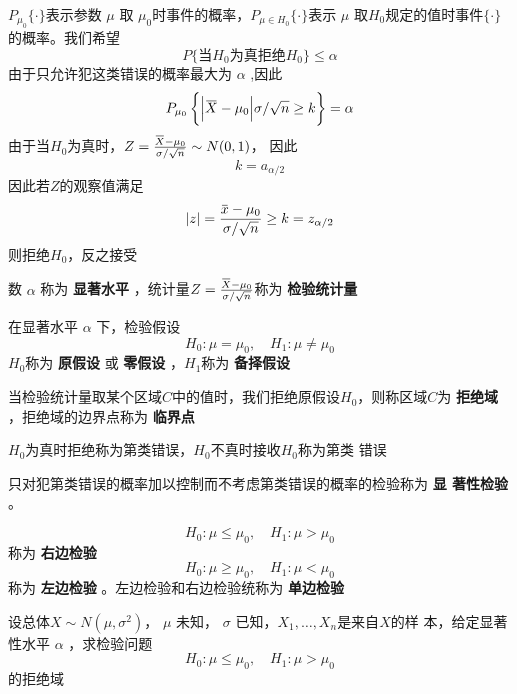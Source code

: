 \documentclass[11pt]{article}
\begin{document}
\(P_{\mu_0}\{\cdot\}\)表示参数 \(\mu\)  取 \(\mu_0\)时事件的概率，\(P_{\mu\in
   H_0}\{\cdot\}\)表示 \(\mu\) 取\(H_0\)规定的值时事件\(\{\cdot\}\)的概率。我们希望
\begin{equation*}
P\{\text{当$H_0$为真拒绝$H_0$}\}\le\alpha
\end{equation*}
由于只允许犯这类错误的概率最大为 \(\alpha\) ,因此
\begin{equation*}
P_{\mu_0}\left\{
\abs{\bbar{X}-\mu_0}{\sigma/\sqrt{n}}\ge k
\right\}=\alpha
\end{equation*}
由于当\(H_0\)为真时，\(Z=\frac{\bbar{X}-\mu_0}{\sigma/\sqrt{n}}\sim N(0,1)\)，
因此
\begin{equation*}
k=a_{\alpha/2}
\end{equation*}
因此若\(Z\)的观察值满足
\begin{equation*}
\abs{z}=\frac{\bbar{x}-\mu_0}{\sigma/\sqrt{n}}\ge k=z_{\alpha/2}
\end{equation*}
则拒绝\(H_0\)，反之接受

数 \(\alpha\) 称为 \textbf{显著水平} ，统计量\(Z=\frac{\bbar{X}-\mu_0}{\sigma/\sqrt{n}}\)称为
\textbf{检验统计量}

在显著水平 \(\alpha\) 下，检验假设
\begin{equation*}
H_0:\mu=\mu_0,\quad H_1:\mu\neq\mu_0
\end{equation*}
\(H_0\)称为 \textbf{原假设} 或 \textbf{零假设} ，\(H_1\)称为 \textbf{备择假设}

当检验统计量取某个区域\(C\)中的值时，我们拒绝原假设\(H_0\)，则称区域\(C\)为
\textbf{拒绝域} ，拒绝域的边界点称为 \textbf{临界点}

\(H_0\)为真时拒绝称为第类错误，\(H_0\)不真时接收\(H_0\)称为第类
错误

只对犯第类错误的概率加以控制而不考虑第类错误的概率的检验称为 \textbf{显
著性检验} 。

\begin{equation*}
H_0:\mu\le\mu_0,\quad H_1:\mu>\mu_0
\end{equation*}
称为 \textbf{右边检验}
\begin{equation*}
H_0:\mu\ge\mu_0,\quad H_1:\mu<\mu_0
\end{equation*}
称为 \textbf{左边检验} 。左边检验和右边检验统称为 \textbf{单边检验}

设总体\(X\sim N(\mu,\sigma^2)\)， \(\mu\) 未知， \(\sigma\) 已知，\(X_1,\dots,X_n\)是来自\(X\)的样
本，给定显著性水平 \(\alpha\) ，求检验问题
\begin{equation*}
H_0:\mu\le \mu_0,\quad H_1:\mu>\mu_0
\end{equation*}
的拒绝域
\end{document}
